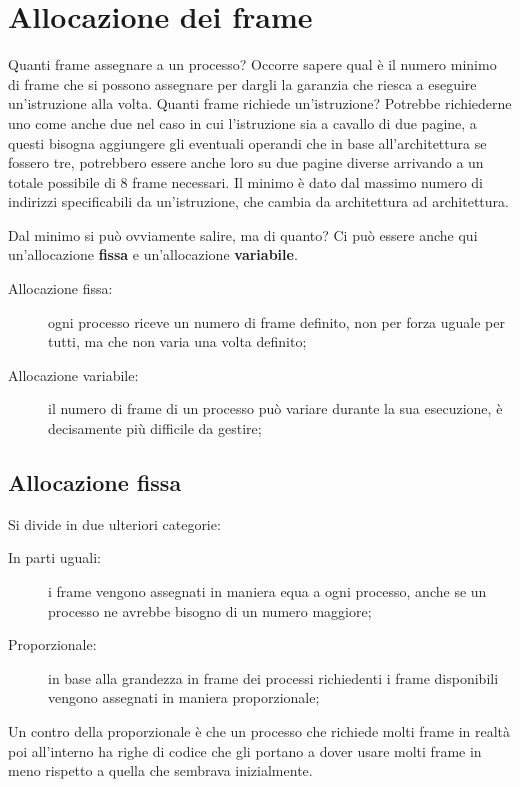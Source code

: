 \documentclass[a4paper, 12pt]{book}
\begin{document}
\chapter{Allocazione dei frame}

Quanti frame assegnare a un processo? Occorre sapere qual è il numero minimo di frame che si possono assegnare per dargli la garanzia 
che riesca a eseguire un'istruzione alla volta. Quanti frame richiede un'istruzione? Potrebbe richiederne uno come anche due nel 
caso in cui l'istruzione sia a cavallo di due pagine, a questi bisogna aggiungere gli eventuali operandi che in base all'architettura 
se fossero tre, potrebbero essere anche loro  su due pagine diverse arrivando a un totale possibile di 8 frame necessari. Il minimo 
è dato dal massimo numero di indirizzi specificabili da un'istruzione, che cambia da architettura ad architettura.

Dal minimo si può ovviamente salire, ma di quanto? Ci può essere anche qui un'allocazione \textbf{fissa} e un'allocazione \textbf{variabile}. 

\begin{description}
    \item[Allocazione fissa:] ogni processo riceve un numero di frame definito, non per forza uguale per tutti, ma che non varia una volta definito;
    \item[Allocazione variabile:] il numero di frame di un processo può variare durante la sua esecuzione, è decisamente più difficile da gestire; 
\end{description}

\section{Allocazione fissa}

Si divide in due ulteriori categorie:

\begin{description}
    \item[In parti uguali:] i frame vengono assegnati in maniera equa a ogni processo, anche se un processo ne avrebbe bisogno di un numero maggiore;
    \item[Proporzionale:] in base alla grandezza in frame dei processi richiedenti i frame disponibili vengono assegnati in maniera proporzionale;  
\end{description}
Un contro della proporzionale è che un processo che richiede molti frame in realtà poi all'interno ha righe di codice che gli portano 
a dover usare molti frame in meno rispetto a quella che sembrava inizialmente. 
\end{document}
